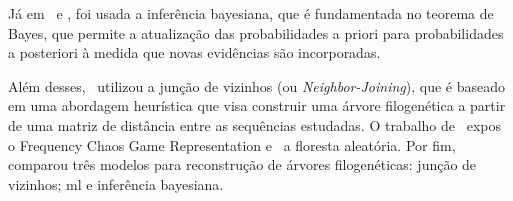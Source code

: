 Já em~\citeauthor{yin_systematic_2019} e \citeauthor{bedoya-pilozo_molecular_epidemiology_2018}, foi usada a inferência bayesiana, que é fundamentada no teorema de Bayes, que permite a atualização das probabilidades a priori para probabilidades a posteriori à medida que novas evidências são incorporadas.

Além desses,~\citeauthor{potdar_phylogenetic_2021} utilizou a junção de vizinhos (ou \textit{Neighbor-Joining}), que é baseado em uma abordagem heurística que visa construir uma árvore filogenética a partir de uma matriz de distância entre as sequências estudadas. O trabalho de~\citeauthor{lichtblau_alignment-free_2019} expos o Frequency Chaos Game Representation e~\citeauthor{kim_ngs_2022} a floresta aleatória. Por fim,~\citeauthor{dimitrov_updated_2019} comparou três modelos para reconstrução de árvores filogenéticas: junção de vizinhos; \gls{ml} e inferência bayesiana.